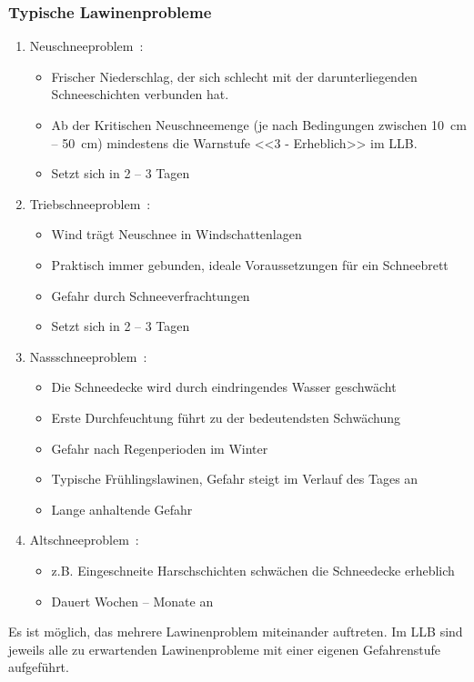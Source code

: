 \pagebreak
\subsubsection{Typische Lawinenprobleme}\label{lawinenprobleme}

\begin{enumerate}
  \item Neuschneeproblem~\cite{achtunglawine}:
  \begin{itemize}
    \item Frischer Niederschlag, der sich schlecht mit der darunterliegenden Schneeschichten verbunden hat. 
    \item Ab der Kritischen Neuschneemenge (je nach Bedingungen zwischen \qty{10}{cm} -- \qty{50}{cm}) mindestens die Warnstufe <<3 - Erheblich>> im LLB.
    \item Setzt sich in 2 -- 3 Tagen
  \end{itemize}
  \item Triebschneeproblem~\cite{achtunglawine}:
  \begin{itemize}
    \item Wind trägt Neuschnee in Windschattenlagen
    \item Praktisch immer gebunden, ideale Voraussetzungen für ein Schneebrett
    \item Gefahr durch Schneeverfrachtungen
    \item Setzt sich in 2 -- 3 Tagen
  \end{itemize}
  \item Nassschneeproblem~\cite{achtunglawine}:
  \begin{itemize}
    \item Die Schneedecke wird durch eindringendes Wasser geschwächt
    \item Erste Durchfeuchtung führt zu der bedeutendsten Schwächung
    \item Gefahr nach Regenperioden im Winter
    \item Typische Frühlingslawinen, Gefahr steigt im Verlauf des Tages an
    \item Lange anhaltende Gefahr
  \end{itemize}
  \item Altschneeproblem~\cite{achtunglawine}:
  \begin{itemize}
    \item z.B. Eingeschneite Harschschichten schwächen die Schneedecke erheblich
    \item Dauert Wochen -- Monate an
  \end{itemize}
\end{enumerate}
Es ist möglich, das mehrere Lawinenproblem miteinander auftreten. Im LLB sind jeweils alle zu erwartenden Lawinenprobleme mit einer eigenen Gefahrenstufe aufgeführt.~\cite{slfTypischeLawinenprobleme}

